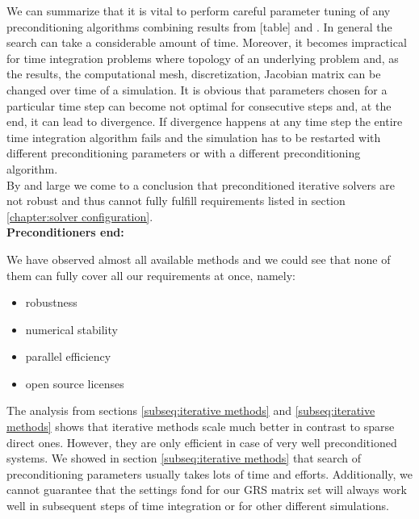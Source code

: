 We can summarize that it is vital to perform careful parameter tuning of any preconditioning algorithms combining results from [table] and \cite{wsmp}. In general the  search can take a considerable amount of time. Moreover, it becomes impractical for time integration problems where topology of an underlying problem and, as the results, the computational mesh, discretization, Jacobian matrix can be changed over time of a simulation. It is obvious that parameters chosen for a particular time step can become not optimal for consecutive steps and, at the end, it can lead to divergence. If divergence happens at any time step the entire time integration algorithm fails and the simulation has to be restarted with different preconditioning parameters or with a different preconditioning algorithm.\\

By and large we come to a conclusion that preconditioned iterative solvers are not robust and thus cannot fully fulfill requirements listed in section \ref{chapter:solver configuration}.\\



\textbf{Preconditioners end:}




We have observed almost all available methods and we could see that none of them can fully cover all our requirements at once, namely:

\begin{itemize}
	\item robustness
	\item numerical stability
	\item parallel efficiency
	\item open source licenses
\end{itemize}


The analysis from sections \ref{subseq:iterative methods} and \ref{subseq:iterative methods} shows that iterative methods scale much better in contrast to sparse direct ones. However, they are only efficient in case of very well preconditioned systems. We showed in section \ref{subseq:iterative methods} that search of preconditioning parameters usually takes lots of time and efforts. Additionally, we cannot guarantee that the settings fond for our GRS matrix set will always work well in subsequent steps of time integration or for other different simulations.\\


